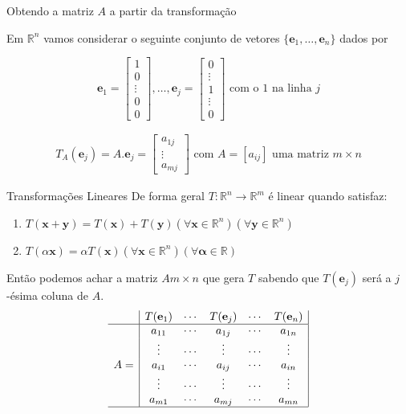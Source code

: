 \documentclass{beamer}
\begin{document}
\begin{frame}{Obtendo a matriz $A$ a partir da transformação}

  Em $\mathbb{R}^n$ vamos considerar o seguinte conjunto de vetores
  $\{\mathbf{e}_1, \dots, \mathbf{e}_n \}$ dados por

  $$ \mathbf{e}_1 = \begin{bmatrix}
    1 \\ 0 \\\vdots\\ 0 \\ 0
  \end{bmatrix}, \dots, \mathbf{e}_j = \begin{bmatrix}
    0 \\ \vdots \\ 1  \\ \vdots \\ 0
  \end{bmatrix} \text{ com o } 1 \text{ na linha } j$$

  \begin{gather*}
  T_A(\mathbf{e}_j) = A.\mathbf{e}_j = \begin{bmatrix}
    a_{1j} \\ \vdots \\ a_{mj} 
  \end{bmatrix} 
   \text{ com } A=[a_{ij}]  \text{ uma matriz } m\times n
 \end{gather*}

\end{frame}

\begin{frame}{Transformações Lineares} 
  De forma geral $T: \mathbb{R}^n \to \mathbb{R}^m$ é linear
  quando satisfaz:
  \begin{enumerate}
    \item $T(\mathbf{x}+\mathbf{y}) = T(\mathbf{x}) + T(\mathbf{y}) (\forall \mathbf{x}\in \mathbb{R}^n)(\forall \mathbf{y}\in \mathbb{R}^n) $
    \item $T(\alpha \mathbf{x})=\alpha T(\mathbf{x})(\forall \mathbf{x}\in \mathbb{R}^n) (\forall \mathbf{\alpha}\in \mathbb{R})$
  \end{enumerate}
  Então podemos achar a matriz $A m \times n$ que gera $T$ sabendo que $T(\mathbf{e}_j)$ será a $j$-ésima coluna de $A$.
  $$
  \begin{array}{c|ccccc|}
     & T(\mathbf{e}_1)&\cdots &T(\mathbf{e}_j)&\cdots& T(\mathbf{e}_n) \\ \hline
     & a_{11} & \cdots & a_{1j} & \cdots & a_{1n} \\
     & \vdots & \cdots & \vdots & \cdots & \vdots \\
   A=  & a_{i1} & \cdots & a_{ij} & \cdots & a_{in} \\
     & \vdots & \cdots & \vdots & \cdots & \vdots\\
     & a_{m1} & \cdots & a_{mj} & \cdots & a_{mn} \\ \hline
    \end{array}
  $$ 
\end{frame}
\end{document}
